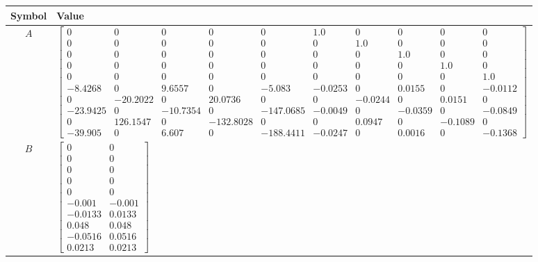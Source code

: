 \begin{tabular}{cl}
\hline
  Symbol  & Value                                                                                                                                                                                                                                                                                                                                                                                                                                                                                                                                                                                                                 \\
\hline
   $A$    & $\left[\begin{matrix}0 & 0 & 0 & 0 & 0 & 1.0 & 0 & 0 & 0 & 0\\0 & 0 & 0 & 0 & 0 & 0 & 1.0 & 0 & 0 & 0\\0 & 0 & 0 & 0 & 0 & 0 & 0 & 1.0 & 0 & 0\\0 & 0 & 0 & 0 & 0 & 0 & 0 & 0 & 1.0 & 0\\0 & 0 & 0 & 0 & 0 & 0 & 0 & 0 & 0 & 1.0\\-8.4268 & 0 & 9.6557 & 0 & -5.083 & -0.0253 & 0 & 0.0155 & 0 & -0.0112\\0 & -20.2022 & 0 & 20.0736 & 0 & 0 & -0.0244 & 0 & 0.0151 & 0\\-23.9425 & 0 & -10.7354 & 0 & -147.0685 & -0.0049 & 0 & -0.0359 & 0 & -0.0849\\0 & 126.1547 & 0 & -132.8028 & 0 & 0 & 0.0947 & 0 & -0.1089 & 0\\-39.905 & 0 & 6.607 & 0 & -188.4411 & -0.0247 & 0 & 0.0016 & 0 & -0.1368\end{matrix}\right]$ \\
   $B$    & $\left[\begin{matrix}0 & 0\\0 & 0\\0 & 0\\0 & 0\\0 & 0\\-0.001 & -0.001\\-0.0133 & 0.0133\\0.048 & 0.048\\-0.0516 & 0.0516\\0.0213 & 0.0213\end{matrix}\right]$                                                                                                                                                                                                                                                                                                                                                                                                                                                       \\

\end{tabular}

